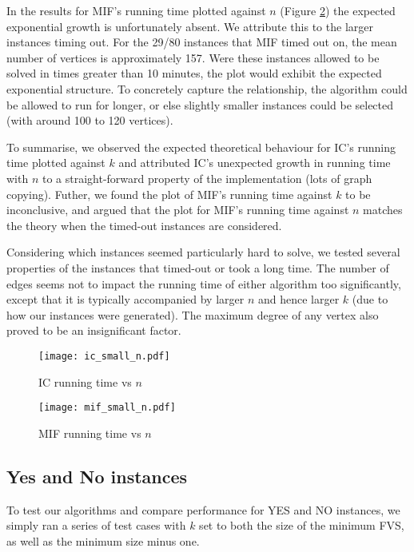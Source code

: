 \documentclass[a4paper,12pt]{article}
\begin{document}
In the results for MIF's running time plotted against $n$ (Figure \ref{fig:mif_small_n}) the expected exponential growth is unfortunately absent. We attribute this to the larger instances timing out. For the 29/80 instances that MIF timed out on, the mean number of vertices is approximately 157. Were these instances allowed to be solved in times greater than 10 minutes, the plot would exhibit the expected exponential structure. To concretely capture the relationship, the algorithm could be allowed to run for longer, or else slightly smaller instances could be selected (with around 100 to 120 vertices).

To summarise, we observed the expected theoretical behaviour for IC's running time plotted against $k$ and attributed IC's unexpected growth in running time with $n$ to a straight-forward property of the implementation (lots of graph copying). Futher, we found the plot of MIF's running time against $k$ to be inconclusive, and argued that the plot for MIF's running time against $n$ matches the theory when the timed-out instances are considered.

Considering which instances seemed particularly hard to solve, we tested several properties of the instances that timed-out or took a long time. The number of edges seems not to impact the running time of either algorithm too significantly, except that it is typically accompanied by larger $n$ and hence larger $k$ (due to how our instances were generated). The maximum degree of any vertex also proved to be an insignificant factor.

\begin{figure}
\centering
\texttt{[image: ic\_small\_n.pdf]}
\caption{IC running time vs $n$}
\label{fig:ic_small_n}
\end{figure}

\begin{figure}
\centering
\texttt{[image: mif\_small\_n.pdf]}
\caption{MIF running time vs $n$}
\label{fig:mif_small_n}
\end{figure}

\pagebreak

\subsection{Yes and No instances}

To test our algorithms and compare performance for YES and NO instances, we simply ran a series of test cases with $k$ set to both the size of the minimum FVS, as well as the minimum size minus one. 
\end{document}

